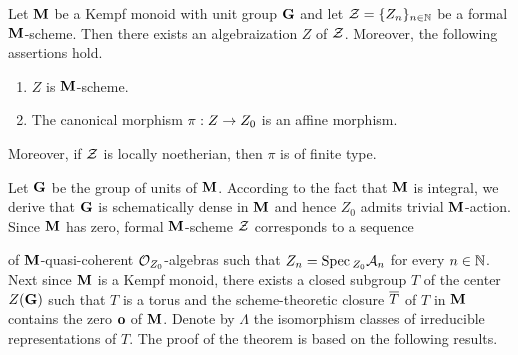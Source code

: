 \begin{theorem}\label{theorem:algebraization}
Let $\mathbf{M}$ be a Kempf monoid with unit group $\mathbf{G}$ and let ${\mathcal Z} = \{Z_n\}_{n\in {\mathbb N}}$ be a formal $\mathbf{M}$-scheme. Then there exists an algebraization $Z$ of ${\mathcal Z}$.
Moreover, the following assertions hold.
\begin{enumerate}[label=\emph{\textbf{(\arabic*)}}, leftmargin=1.5em]
\item $Z$ is $\mathbf{M}$-scheme.
\item The canonical morphism $\pi:Z\rightarrow Z_0$ is an affine morphism.
\end{enumerate}
Moreover, if ${\mathcal Z}$ is locally noetherian, then $\pi$ is of finite type.
\end{theorem}
\noindent
Let $\mathbf{G}$ be the group of units of $\mathbf{M}$. According to the fact that $\mathbf{M}$ is integral, we derive that $\mathbf{G}$ is schematically dense in $\mathbf{M}$ and hence $Z_0$ admits trivial $\mathbf{M}$-action. Since $\mathbf{M}$ has zero, formal $\mathbf{M}$-scheme ${\mathcal Z}$ corresponds to a sequence
\begin{center}
\end{center}
of $\mathbf{M}$-quasi-coherent ${\mathcal O}_{Z_0}$-algebras such that $Z_n = \mathrm{Spec}\,_{Z_0}{\mathcal A}_n$ for every $n\in {\mathbb N}$. Next since $\mathbf{M}$ is a Kempf monoid, there exists a closed subgroup $T$ of the center $Z(\mathbf{G})$ such that $T$ is a torus and the scheme-theoretic closure $\overline{T}$ of $T$ in $\mathbf{M}$ contains the zero $\mathbf{o}$ of $\mathbf{M}$. Denote by $\Lambda$ the isomorphism classes of irreducible representations of $T$. The proof of the theorem is based on the following results.

